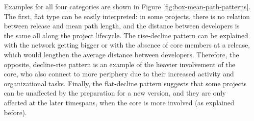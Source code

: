 Examples for all four categories are shown in Figure \ref{fig:box-mean-path-patterns}. The first, flat type can be easily interpreted: in some projects, there is no relation between release and mean path length, and the distance between developers is the same all along the project lifecycle. The rise-decline pattern can be explained with the network getting bigger or with the absence of core members at a release, which would lengthen the average distance between developers. Therefore, the opposite, decline-rise pattern is an example of the heavier involvement of the core, who also connect to more periphery due to their increased activity and organizational tasks. Finally, the flat-decline pattern suggests that some projects can be unaffected by the preparation for a new version, and they are only affected at the later timespans, when the core is more involved (as explained before).

